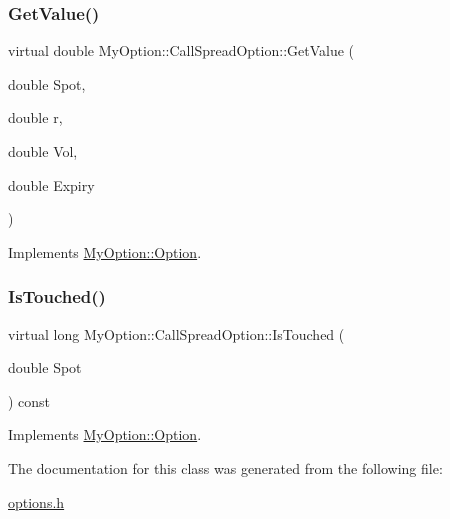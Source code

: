 \subsubsection{\texorpdfstring{Get\+Value()}{GetValue()}\hspace{0.1cm}{\footnotesize\ttfamily [3/3]}}
{\footnotesize\ttfamily virtual double My\+Option\+::\+Call\+Spread\+Option\+::\+Get\+Value (\begin{DoxyParamCaption}\item[{double}]{Spot,  }\item[{double}]{r,  }\item[{double}]{Vol,  }\item[{double}]{Expiry }\end{DoxyParamCaption})\hspace{0.3cm}{\ttfamily [virtual]}}



Implements \hyperlink{classMyOption_1_1Option_a62422d3dc60eabe65cfa94d2a452f5f8}{My\+Option\+::\+Option}.

\hypertarget{classMyOption_1_1CallSpreadOption_a83f8cda1ab9e49df49f8d08d0bab23c7}{}\label{classMyOption_1_1CallSpreadOption_a83f8cda1ab9e49df49f8d08d0bab23c7} 
\subsubsection{\texorpdfstring{Is\+Touched()}{IsTouched()}}
{\footnotesize\ttfamily virtual long My\+Option\+::\+Call\+Spread\+Option\+::\+Is\+Touched (\begin{DoxyParamCaption}\item[{double}]{Spot }\end{DoxyParamCaption}) const\hspace{0.3cm}{\ttfamily [virtual]}}



Implements \hyperlink{classMyOption_1_1Option_ade57d2fcb9f22f3c2a57d75f55444c33}{My\+Option\+::\+Option}.



The documentation for this class was generated from the following file\+:\begin{DoxyCompactItemize}
\item 
\hyperlink{options_8h}{options.\+h}\end{DoxyCompactItemize}
